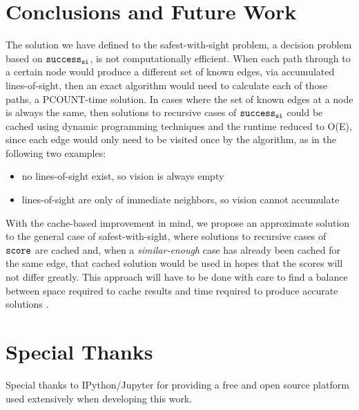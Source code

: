 \documentclass{article}
\begin{document}
    \section{Conclusions and Future Work}\label{conclusions-and-future-work}

    The solution we have defined to the safest-with-sight problem, a
decision problem based on $\tt{success}_{si}$, is not computationally
efficient. When each path through to a certain node would produce a
different set of known edges, via accumulated lines-of-sight, then an
exact algorithm would need to calculate each of those paths, a
PCOUNT-time solution. In cases where the set of known edges at a node is
always the same, then solutions to recursive cases of
$\tt{success}_{si}$ could be cached using dynamic programming techniques
and the runtime reduced to O(E), since each edge would only need to be
visited once by the algorithm, as in the following two examples:

\begin{itemize}
\itemsep1pt\parskip0pt
\item
  no lines-of-sight exist, so vision is always empty
\item
  lines-of-sight are only of immediate neighbors, so vision cannot
  accumulate
\end{itemize}

With the cache-based improvement in mind, we propose an approximate
solution to the general case of safest-with-sight, where solutions to
recursive cases of $\tt{score}$ are cached and, when a
\emph{similar-enough} case has already been cached for the same edge,
that cached solution would be used in hopes that the scores will not
differ greatly. This approach will have to be done with care to find a
balance between space required to cache results and time required to
produce accurate solutions \cite{powell11}.

    \section{Special Thanks}\label{special-thanks}

    Special thanks to IPython/Jupyter \cite{ipython} for providing a free
and open source platform used extensively when developing this work.




    



    
    
\end{document}
